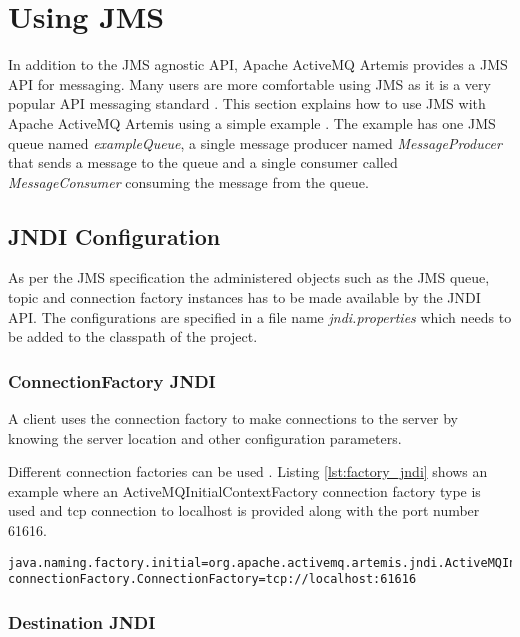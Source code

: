 \section{Using JMS}

In addition to the JMS agnostic API, Apache ActiveMQ Artemis provides a JMS API for messaging. Many users are more comfortable using JMS as it is a very popular API messaging standard \parencite{Menth:2006:TPP:1140277.1140323}. This section explains how to use JMS with Apache ActiveMQ Artemis using a simple example \parencite{artemis_jms}. The example has one JMS queue named \textit{exampleQueue}, a single message producer named \textit{MessageProducer} that sends a message to the queue and a single consumer called \textit{MessageConsumer} consuming the message from the queue.

\subsection{JNDI Configuration}

As per the JMS specification the administered objects such as the JMS queue, topic and connection factory instances has to be made available by the JNDI API. The configurations are specified in a file name \textit{jndi.properties} which needs to be added to the classpath of the project.

\subsubsection{ConnectionFactory JNDI}

A client uses the connection factory to make connections to the server by knowing the server location and other configuration parameters. 

Different connection factories can be used \parencite{jms_cf}. Listing \ref{lst:factory_jndi} shows an example where an ActiveMQInitialContextFactory connection factory type is used and tcp connection to localhost is provided along with the port number 61616.

\bigskip
\begin{lstlisting}[style=BashInputStyle,caption=ConnectionFactory JNDI, label={lst:factory_jndi}]
java.naming.factory.initial=org.apache.activemq.artemis.jndi.ActiveMQInitialContextFactory
connectionFactory.ConnectionFactory=tcp://localhost:61616
\end{lstlisting}

\subsubsection{Destination JNDI}

